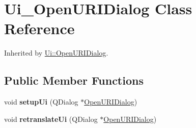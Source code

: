 \hypertarget{class_ui___open_u_r_i_dialog}{}\section{Ui\+\_\+\+Open\+U\+R\+I\+Dialog Class Reference}
\label{class_ui___open_u_r_i_dialog}


Inherited by \mbox{\hyperlink{class_ui_1_1_open_u_r_i_dialog}{Ui\+::\+Open\+U\+R\+I\+Dialog}}.

\subsection*{Public Member Functions}
\begin{DoxyCompactItemize}
\item 
\mbox{\label{class_ui___open_u_r_i_dialog_a4c5b5a4e6911c5bdad44fdb3e7e82bba}} 
void {\bfseries setup\+Ui} (Q\+Dialog $\ast$\mbox{\hyperlink{class_open_u_r_i_dialog}{Open\+U\+R\+I\+Dialog}})
\item 
\mbox{\label{class_ui___open_u_r_i_dialog_a5c876db8fc002376ac8d4163605deed7}} 
void {\bfseries retranslate\+Ui} (Q\+Dialog $\ast$\mbox{\hyperlink{class_open_u_r_i_dialog}{Open\+U\+R\+I\+Dialog}})
\end{DoxyCompactItemize}
